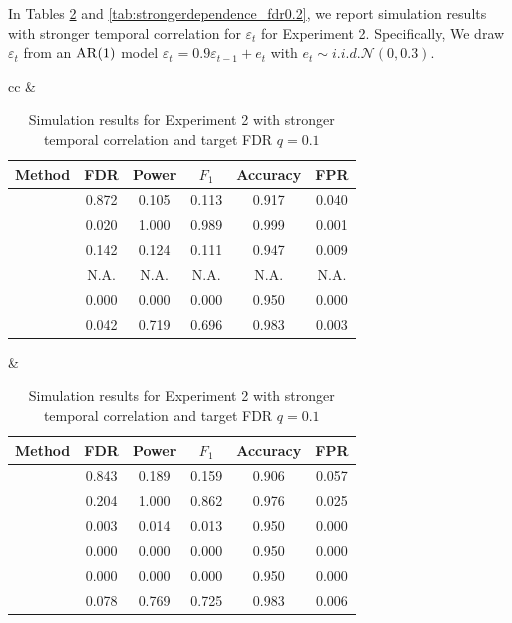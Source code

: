 ﻿\documentclass[12pt]{article}
\newcommand{\0}{\mbox{\bf 0}}
\theoremstyle{plain}%
\theoremstyle{definition}
\def\func#1{\mathop{\rm #1}}%
\begin{document}
{In Tables \ref{tab:strongerdependence_fdr0.1} and \ref{tab:strongerdependence_fdr0.2}, we report simulation results with stronger temporal correlation for $\varepsilon_t$ for Experiment 2. Specifically, We draw $%
\varepsilon_t$ from an $\func{AR}(1)$ model $\varepsilon_t=0.9
\varepsilon_{t-1}+e_t$ with $e_t \sim i.i.d. \mathcal{N}(0,0.3)$.




\begin{table}[htbp]
\caption{Simulation results for Experiment 2 with stronger temporal correlation and target FDR $q = 0.1$}
\label{tab:strongerdependence_fdr0.1}
\centering
\scriptsize
\setlength{\tabcolsep}{4pt}
\renewcommand{\arraystretch}{1.05}
\begin{tabular}{cc}
 &  \\
\begin{tabular}{lccccc}
\toprule
Method & FDR & Power & $F_1$ & Accuracy & FPR \\
\midrule
\sc{Lasso}         &    0.872  & 0.105  & 0.113  & 0.917  & 0.040  \\
\sc{FarmSelect}    &    0.020  & 1.000  & 0.989  & 0.999  & 0.001  \\
\sc{Model-X}       &     0.142  & 0.124  & 0.111  & 0.947  & 0.009  \\
\sc{Fixed-X}       & N.A.  & N.A.  & N.A.  & N.A.  & N.A.  \\
\sc{TSKI}          &    0.000  & 0.000  & 0.000  & 0.950  & 0.000  \\
\sc{FAR-Knockoff} & 0.042 & 0.719 & 0.696 & 0.983 & 0.003 \\

\bottomrule
\end{tabular}
&
\begin{tabular}{lccccc}
\toprule
Method & FDR & Power & $F_1$ & Accuracy & FPR \\
\midrule
\sc{Lasso}         &    0.843  & 0.189  & 0.159  & 0.906  & 0.057  \\
\sc{FarmSelect}    &    0.204  & 1.000  & 0.862  & 0.976  & 0.025  \\
\sc{Model-X}       &     0.003  & 0.014  & 0.013  & 0.950  & 0.000  \\
\sc{Fixed-X }      &    0.000  & 0.000  & 0.000  & 0.950  & 0.000  \\
\sc{TSKI}          &    0.000  & 0.000  & 0.000  & 0.950  & 0.000  \\
\sc{FAR-Knockoff} & 0.078 & 0.769 & 0.725 & 0.983 & 0.006 \\


\end{tabular}
\end{tabular}
\end{table}}
\end{document}
